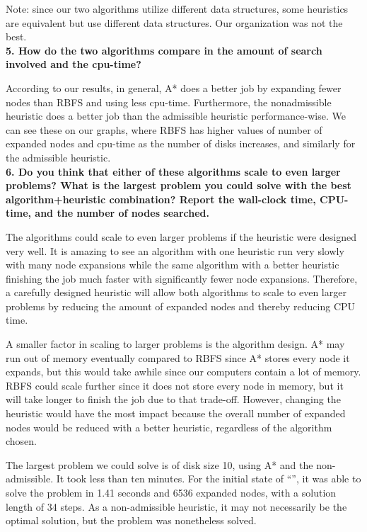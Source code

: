 Note: since our two algorithms utilize different data structures, some heuristics are equivalent but use different data structures. Our organization was not the best.\\

\textbf{5. How do the two algorithms compare in the amount of search involved and the cpu-time?}

According to our results, in general, A* does a better job by expanding fewer nodes than RBFS and using less cpu-time. Furthermore, the nonadmissible heuristic does a better job than the admissible heuristic performance-wise. We can see these on our graphs, where RBFS has higher values of number of expanded nodes and cpu-time as the number of disks increases, and similarly for the admissible heuristic.\\

\textbf{6. Do you think that either of these algorithms scale to even larger problems? What is the largest problem you could solve with the best algorithm+heuristic combination? Report the wall-clock time, CPU-time, and the number of nodes searched.}

The algorithms could scale to even larger problems if the heuristic were designed very well. It is amazing to see an algorithm with one heuristic run very slowly with many node expansions while the same algorithm with a better heuristic finishing the job much faster with significantly fewer node expansions. Therefore, a carefully designed heuristic will allow both algorithms to scale to even larger problems by reducing the amount of expanded nodes and thereby reducing CPU time.

A smaller factor in scaling to larger problems is the algorithm design. A* may run out of memory eventually compared to RBFS since A* stores every node it expands, but this would take awhile since our computers contain a lot of memory. RBFS could scale further since it does not store every node in memory, but it will take longer to finish the job due to that trade-off. However, changing the heuristic would have the most impact because the overall number of expanded nodes would be reduced with a better heuristic, regardless of the algorithm chosen.

The largest problem we could solve is of disk size 10, using A* and the non-admissible. It took less than ten minutes. For the initial state of ``'', it was able to solve the problem in 1.41 seconds and 6536 expanded nodes, with a solution length of 34 steps. As a non-admissible heuristic, it may not necessarily be the optimal solution, but the problem was nonetheless solved.

